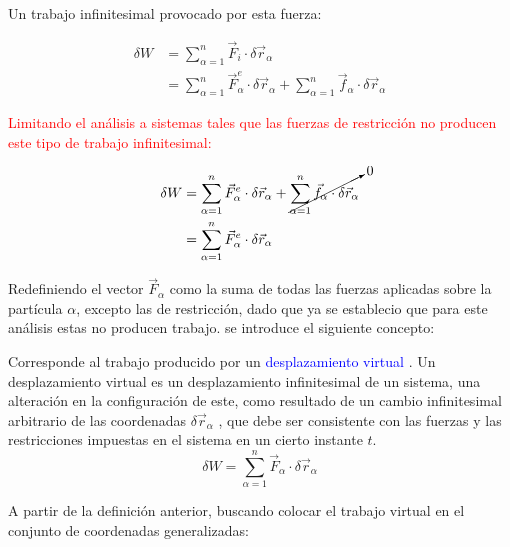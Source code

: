 \documentclass[/home/hernan/Documentos/Apuntes_mecanica_teorica/main.tex]{subfiles}
\begin{document}
    Un trabajo infinitesimal provocado por esta fuerza:

    \begin{align*}
        \delta W &= \sum_{\alpha=1}^{n} \vec{F}_{i}  \cdot \delta \vec{r}_{\alpha} \\ 
                &= \sum_{\alpha=1}^{n} \vec{F}_{\alpha} ^{e}  \cdot \delta \vec{r}_{\alpha} + \sum_{\alpha=1}^{n} \vec{f}_{\alpha}  \cdot \delta \vec{r}_{\alpha}
    \end{align*}

    \textcolor{red}{Limitando el análisis a sistemas tales que las fuerzas de restricción no producen este tipo de trabajo infinitesimal:} 

    \begin{align*}
        \delta W &= \sum_{\alpha=1}^{n} \vec{F}_{\alpha} ^{e} \cdot \delta \vec{r}_{\alpha} + \cancelto{0}{\sum_{\alpha=1}^{n} \vec{f}_{\alpha}  \cdot \delta \vec{r}_{\alpha}} \\ 
            & = \sum_{\alpha=1}^{n} \vec{F}_{\alpha} ^{e} \cdot \delta \vec{r}_{\alpha}
    \end{align*}

    Redefiniendo el vector $\vec{F}_{\alpha}$ como la suma de todas las fuerzas aplicadas sobre la partícula $\alpha$, excepto las de restricción, dado que ya se establecio que para este análisis estas no producen trabajo. se introduce el siguiente concepto:


    \begin{definition} 
        Corresponde al trabajo producido por un \textcolor{blue}{desplazamiento virtual }. Un desplazamiento virtual es un desplazamiento infinitesimal de un sistema, una alteración en la configuración de este, como resultado de un cambio infinitesimal arbitrario de las coordenadas $\delta \vec{r}_{\alpha}$ , que debe ser consistente con las fuerzas y las restricciones impuestas en el sistema en un cierto instante $t$. \\ 

        \begin{equation}
            \delta W = \sum_{\alpha=1}^{n} \vec{F}_{\alpha}  \cdot \delta \vec{r}_{\alpha}
            \label{eq: trabajovirtual}
        \end{equation}
    \end{definition}

    A partir de la definición anterior, buscando colocar el trabajo virtual en el conjunto de coordenadas generalizadas:\\ 
\end{document}
